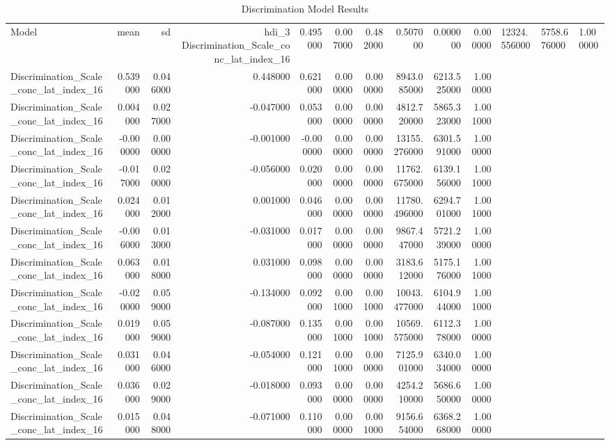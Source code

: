 \begin{table}
\caption{Discrimination Model Results}
\label{tab:disc_results}
\begin{tabular}{lrrrrrrrrr}
\toprule
Model & mean & sd & hdi_3%
\midrule
Discrimination_Scale_conc_lat_index_16 & 0.495000 & 0.007000 & 0.482000 & 0.507000 & 0.000000 & 0.000000 & 12324.556000 & 5758.676000 & 1.000000 \\
Discrimination_Scale_conc_lat_index_16 & 0.539000 & 0.046000 & 0.448000 & 0.621000 & 0.000000 & 0.000000 & 8943.085000 & 6213.525000 & 1.000000 \\
Discrimination_Scale_conc_lat_index_16 & 0.004000 & 0.027000 & -0.047000 & 0.053000 & 0.000000 & 0.000000 & 4812.720000 & 5865.323000 & 1.001000 \\
Discrimination_Scale_conc_lat_index_16 & -0.000000 & 0.000000 & -0.001000 & -0.000000 & 0.000000 & 0.000000 & 13155.276000 & 6301.591000 & 1.000000 \\
Discrimination_Scale_conc_lat_index_16 & -0.017000 & 0.020000 & -0.056000 & 0.020000 & 0.000000 & 0.000000 & 11762.675000 & 6139.156000 & 1.001000 \\
Discrimination_Scale_conc_lat_index_16 & 0.024000 & 0.012000 & 0.001000 & 0.046000 & 0.000000 & 0.000000 & 11780.496000 & 6294.701000 & 1.001000 \\
Discrimination_Scale_conc_lat_index_16 & -0.006000 & 0.013000 & -0.031000 & 0.017000 & 0.000000 & 0.000000 & 9867.447000 & 5721.239000 & 1.000000 \\
Discrimination_Scale_conc_lat_index_16 & 0.063000 & 0.018000 & 0.031000 & 0.098000 & 0.000000 & 0.000000 & 3183.612000 & 5175.176000 & 1.001000 \\
Discrimination_Scale_conc_lat_index_16 & -0.020000 & 0.059000 & -0.134000 & 0.092000 & 0.001000 & 0.001000 & 10043.477000 & 6104.944000 & 1.001000 \\
Discrimination_Scale_conc_lat_index_16 & 0.019000 & 0.059000 & -0.087000 & 0.135000 & 0.001000 & 0.001000 & 10569.575000 & 6112.378000 & 1.000000 \\
Discrimination_Scale_conc_lat_index_16 & 0.031000 & 0.046000 & -0.054000 & 0.121000 & 0.001000 & 0.000000 & 7125.901000 & 6340.034000 & 1.000000 \\
Discrimination_Scale_conc_lat_index_16 & 0.036000 & 0.029000 & -0.018000 & 0.093000 & 0.000000 & 0.000000 & 4254.210000 & 5686.650000 & 1.000000 \\
Discrimination_Scale_conc_lat_index_16 & 0.015000 & 0.048000 & -0.071000 & 0.110000 & 0.000000 & 0.001000 & 9156.654000 & 6368.268000 & 1.000000 \\

\end{tabular}
\end{table}
